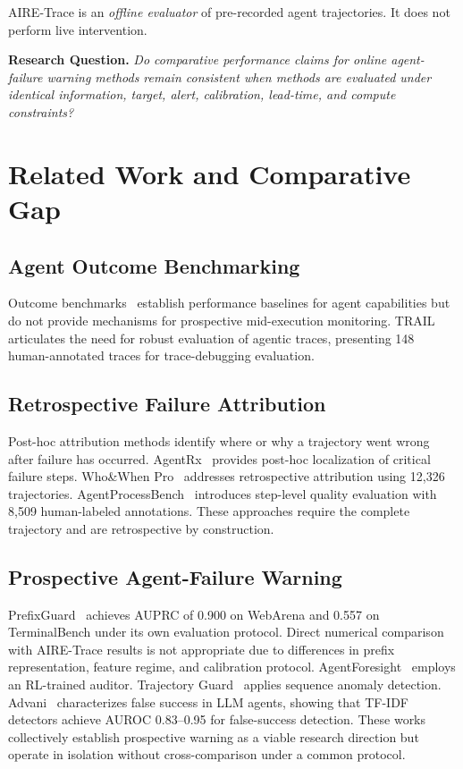 \documentclass[conference,letterpaper]{IEEEtran}
\begin{document}
AIRE-Trace is an \textit{offline evaluator} of pre-recorded agent
trajectories. It does not perform live intervention.

\textbf{Research Question.} \textit{Do comparative performance claims
for online agent-failure warning methods remain consistent when methods
are evaluated under identical information, target, alert, calibration,
lead-time, and compute constraints?}

\section{Related Work and Comparative Gap}

\subsection{Agent Outcome Benchmarking}
Outcome benchmarks~\cite{b1,b2,b3} establish performance baselines for
agent capabilities but do not provide mechanisms for prospective
mid-execution monitoring. TRAIL~\cite{b4} articulates the need for
robust evaluation of agentic traces, presenting 148 human-annotated
traces for trace-debugging evaluation.

\subsection{Retrospective Failure Attribution}
Post-hoc attribution methods identify where or why a trajectory went
wrong after failure has occurred. AgentRx~\cite{b5} provides post-hoc
localization of critical failure steps. Who\&When Pro~\cite{b6}
addresses retrospective attribution using 12{,}326 trajectories.
AgentProcessBench~\cite{b11} introduces step-level quality evaluation
with 8{,}509 human-labeled annotations. These approaches require the
complete trajectory and are retrospective by construction.

\subsection{Prospective Agent-Failure Warning}
PrefixGuard~\cite{b7} achieves AUPRC of 0.900 on WebArena and 0.557 on
TerminalBench under its own evaluation protocol. Direct numerical
comparison with AIRE-Trace results is not appropriate due to differences
in prefix representation, feature regime, and calibration protocol.
AgentForesight~\cite{b8} employs an RL-trained auditor. Trajectory
Guard~\cite{b9} applies sequence anomaly detection. Advani~\cite{b10}
characterizes false success in LLM agents, showing that TF-IDF detectors
achieve AUROC 0.83--0.95 for false-success detection. These works
collectively establish prospective warning as a viable research direction
but operate in isolation without cross-comparison under a common
protocol.
\end{document}
